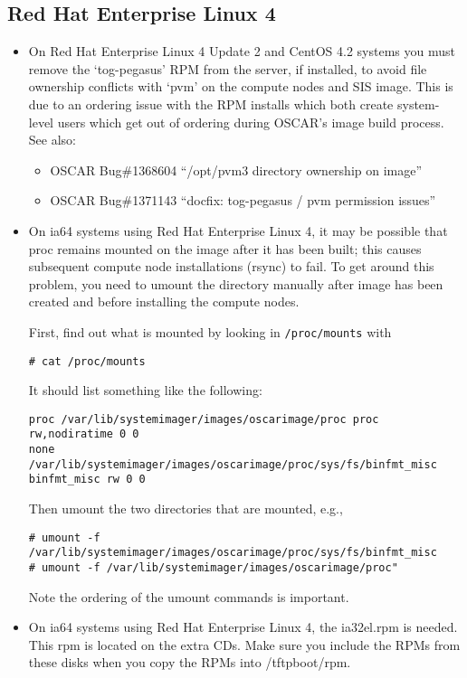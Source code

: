 
\subsection{Red Hat Enterprise Linux 4}
\label{subsec:rhel4notes}

\begin{itemize}

\item On Red Hat Enterprise Linux 4 Update 2 and CentOS 4.2 systems you 
      must remove the `tog-pegasus' RPM from the server, if installed, to 
      avoid file ownership conflicts with `pvm' on the compute nodes and SIS 
      image.  This is due to an ordering issue with the RPM installs which 
      both create system-level users which get out of ordering during OSCAR's 
      image build process.  See also:
      \begin{itemize}
		\item OSCAR Bug\#1368604 ``/opt/pvm3 directory ownership on image''
		\item OSCAR Bug\#1371143 ``docfix: tog-pegasus / pvm permission issues''
      \end{itemize}

\item On ia64 systems using Red Hat Enterprise Linux 4, it may be possible
  that proc remains mounted
  on the image after it has been built; this causes subsequent compute node
  installations (rsync) to fail.  To get around this problem, you need to
  umount the directory manually after image has been created and before
  installing the compute nodes.
 
  First, find out what is mounted by looking in {\tt /proc/mounts} with
  \begin{verbatim}
# cat /proc/mounts
  \end{verbatim}
  It should list something like the following:
  \begin{verbatim}
proc /var/lib/systemimager/images/oscarimage/proc proc rw,nodiratime 0 0
none /var/lib/systemimager/images/oscarimage/proc/sys/fs/binfmt_misc
binfmt_misc rw 0 0
  \end{verbatim}
  Then umount the two directories that are mounted, e.g.,
  \begin{verbatim}
# umount -f /var/lib/systemimager/images/oscarimage/proc/sys/fs/binfmt_misc
# umount -f /var/lib/systemimager/images/oscarimage/proc"
  \end{verbatim}
  Note the ordering of the umount commands is important.

\item On ia64 systems using Red Hat Enterprise Linux 4, the ia32el.rpm is
  needed.  This rpm is located on the extra CDs.  Make sure you include
  the RPMs from these disks when you copy the RPMs into /tftpboot/rpm.

\end{itemize}

